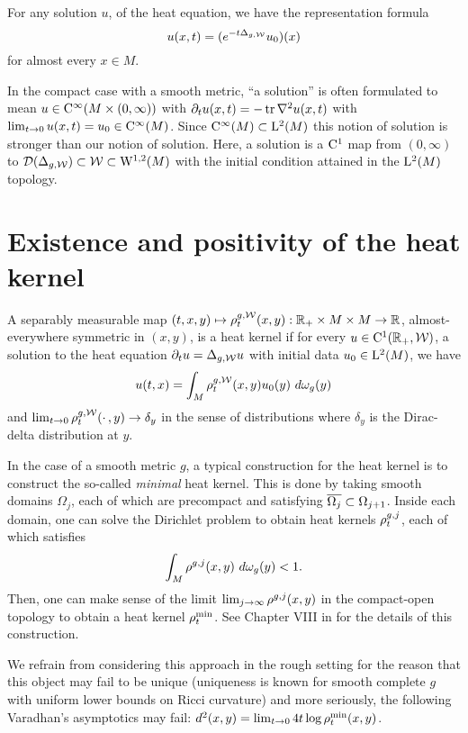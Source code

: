 \documentclass[a4paper, 12pt]{amsart}
\begin{document}
For any solution \(u\), of the heat equation, we have the representation formula
\[
u(x,t) = (e^{-t \Delta_{g,\mathcal{W}}}u_0)(x)
\]
for almost every $x \in M$.
 
\begin{rem}
In the compact case with a smooth metric, ``a solution'' is often formulated to mean $u \in {\rm C}^{\infty}_{\rm {}}( M \times (0, \infty))$
with $\partial_t u(x,t) = -\operatorname{tr} \nabla^2 u(x,t)$ with 
$\lim_{t \to 0} u(x,t) = u_0 \in {\rm C}^{\infty}_{\rm {}}(M)$.
Since ${\rm C}^{\infty}_{\rm {}}(M) \subset {\rm L}^{2}_{\rm {}}(M)$ this notion of solution is stronger than our notion of solution. Here, a solution is a ${\rm C}^{1}_{\rm {}}$ map from $(0, \infty)$ to ${\mathcal{D}}(\Delta_{g,\mathcal{W}}) \subset \mathcal{W} \subset {{\rm W}^{1,2}_{\rm {}}}(M)$ with the initial condition attained in the ${\rm L}^{2}_{\rm {}}(M)$ topology.
\end{rem}

\section{Existence and positivity of the heat kernel}

\begin{defn}
A separably measurable map $(t,x,y) \mapsto \rho^{g,\mathcal{W}}_{t}(x,y): \mathbb{R}_+ \times M \times M \to \mathbb{R}$, 
almost-everywhere symmetric in $(x,y)$, is a heat kernel 
if for every $u \in {\rm C}^{1}_{\rm {}}(\mathbb{R}_+, \mathcal{W})$, a solution to the heat equation 
$\partial_t u = \Delta_{g,\mathcal{W}}u$ with initial data $u_0 \in {\rm L}^{2}_{\rm {}}(M)$, we have
\[
u(t,x) = \int_{M} \hk^{g,\cW}_t(x,y) u_0(y)\ d\omega_g(y)
\]
and
$\lim_{t \to 0} \rho_t^{g,\mathcal{W}}(\cdotp,y) \to \delta_y$ in the sense of distributions where $\delta_y$ is the Dirac-delta distribution at $y$.
\end{defn}

In the case of a smooth metric $g$, a typical construction for
the heat kernel is to construct the so-called \emph{minimal} heat kernel.
This is done by taking smooth domains $\Omega_j$, 
each of which are precompact and satisfying $\overline{\Omega_j} \subset \Omega_{j+1}$. 
Inside each domain, one can solve the Dirichlet problem
to obtain heat kernels $\rho^{g,j}_{t}$, each of which
satisfies 
$$ \int_{M} \hk^{g,j}(x,y)\ d\omega_g(y) < 1.$$
Then, one can make sense of the limit $\lim_{j \to \infty} \rho^{g,j}(x,y)$
in the compact-open topology to obtain a heat kernel $\rho^{\min}_t$.
See Chapter VIII in \cite{Chavel} for the details
of this construction.

We refrain from considering this approach in the rough setting 
for the reason that this object may fail to be unique (uniqueness
is known for smooth complete $g$ with 
uniform lower bounds on Ricci curvature) and more seriously, the following
Varadhan's asymptotics may fail: 
$d^2(x,y) = \lim_{t \to 0} 4t \log \rho^{\min}_t(x,y)$.
\end{document}
